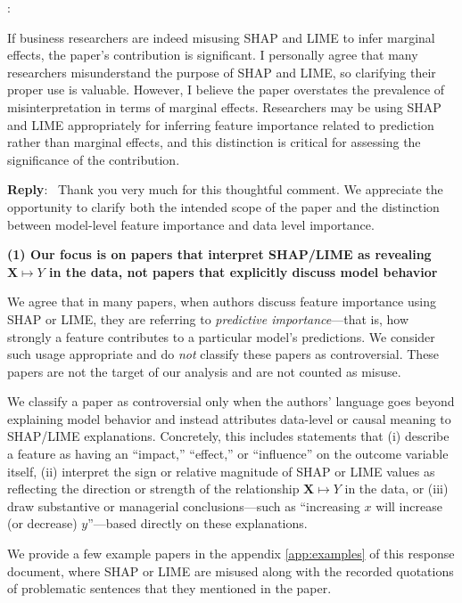 \documentclass[11pt]{article}
\newcounter{se}[section]
\newcounter{reviewer}
\newcounter{point}[reviewer]
\renewcommand{\thepoint}{R\,\thereviewer.\arabic{point}}
\newenvironment{point}{
    \refstepcounter{point} \bigskip \noindent {\textbf{\thepoint}}: \rmfamily \itshape
}{\medskip}
\newenvironment{reply}
 {\par\medskip \noindent \begin{sf}\textbf{Reply}:\ }
 {\medskip \end{sf}}
\begin{document}
\begin{point}
If business researchers are indeed misusing SHAP and LIME to infer marginal effects, the paper’s contribution is significant. I personally agree that many researchers misunderstand the purpose of SHAP and LIME, so clarifying their proper use is valuable. However, I believe the paper overstates the prevalence of misinterpretation in terms of marginal effects. Researchers may be using SHAP and LIME appropriately for inferring feature importance related to prediction rather than marginal effects, and this distinction is critical for assessing the significance of the contribution.
\end{point}

\begin{reply}
Thank you very much for this thoughtful comment.  We appreciate the opportunity to clarify both the intended scope of the paper and the distinction between model-level feature importance and data level  importance.

\vspace{0.3cm}
\textbf{(1) Our focus is on papers that interpret SHAP/LIME as revealing $\mathbf{X} \mapsto Y$ in the data, not papers that explicitly discuss model behavior}

We agree that in many papers, when authors discuss feature importance using SHAP or LIME, they are referring to \emph{predictive importance}—that is, how strongly a feature contributes to a particular model’s predictions. We consider such usage appropriate and do \emph{not} classify these papers as controversial. These papers are not the target of our analysis and are not counted as misuse.

We classify a paper as controversial only when the authors’ language goes beyond explaining model behavior and instead attributes data-level or causal meaning to SHAP/LIME explanations. Concretely, this includes statements that (i) describe a feature as having an “impact,” “effect,” or “influence” on the outcome variable itself, (ii) interpret the sign or relative magnitude of SHAP or LIME values as reflecting the direction or strength of the relationship $\mathbf{X} \mapsto Y$ in the data, or (iii) draw substantive or managerial conclusions—such as “increasing $x$ will increase (or decrease) $y$”—based directly on these explanations.

 We provide a few example papers in the appendix \ref{app:examples} of this response document,  where SHAP or LIME are misused along with the recorded quotations of problematic sentences that they mentioned in the paper.




\end{reply}
\end{document}
